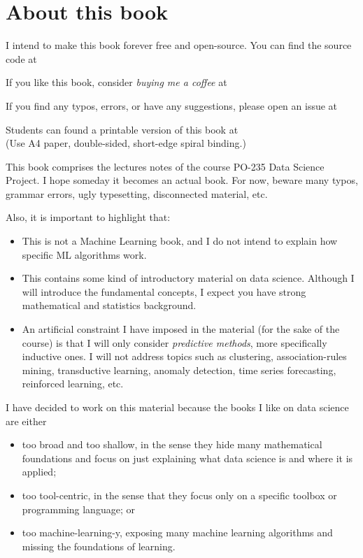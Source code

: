 \chapter*{About this book}

I intend to make this book forever free and open-source.
You can find the source code at\\


\vfill
If you like this book, consider \emph{buying me a coffee} at\\

\vfill
If you find any typos, errors, or have any suggestions, please open an issue at\\

\vfill
Students can found a printable version of this book at\\
(Use A4 paper, double-sided, short-edge spiral binding.)

\newpage
This book comprises the lectures notes of the course PO-235 Data Science Project.
I hope someday it becomes an actual book. For now, beware many typos, grammar errors, ugly
typesetting, disconnected material, etc.

Also, it is important to highlight that:
\begin{itemize}
  \item This is not a Machine Learning book, and I do not intend to explain how specific
    ML algorithms work.
  \item This contains some kind of introductory material on data science.  Although I will
    introduce the fundamental concepts, I expect you have strong mathematical and
    statistics background.
  \item An artificial constraint I have imposed in the material (for the sake of the
    course) is that I will only consider \emph{predictive methods}, more specifically
    inductive ones. I will not address topics such as clustering, association-rules
    mining, transductive learning, anomaly detection, time series forecasting, reinforced
    learning, etc.
\end{itemize}

I have decided to work on this material because the books I like on data science are
either
\begin{itemize}
  \item too broad and too shallow, in the sense they hide many mathematical foundations
    and focus on just explaining what data science is and where it is applied;
  \item too tool-centric, in the sense that they focus only on a specific toolbox or
    programming language; or
  \item too machine-learning-y, exposing many machine learning algorithms and missing the
    foundations of learning.
\end{itemize}

